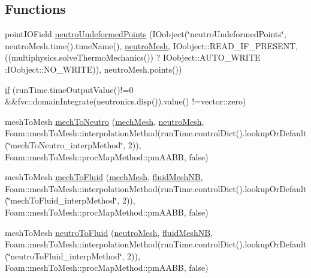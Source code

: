 \subsection*{Functions}
\begin{DoxyCompactItemize}
\item 
point\+I\+O\+Field \hyperlink{createMeshInterpolators_8H_ae1e667a7209da7536e92efe526231ddb}{neutro\+Undeformed\+Points} (I\+Oobject(\char`\"{}neutro\+Undeformed\+Points\char`\"{}, neutro\+Mesh.\+time().time\+Name(), \hyperlink{createNeutroMesh_8H_a5b79902f9ab3ed1763fd3355f92d1cc2}{neutro\+Mesh}, I\+Oobject\+::\+R\+E\+A\+D\+\_\+\+I\+F\+\_\+\+P\+R\+E\+S\+E\+NT,((multiphysics.\+solve\+Thermo\+Mechanics()) ? I\+Oobject\+::\+A\+U\+T\+O\+\_\+\+W\+R\+I\+TE \+:I\+Oobject\+::\+N\+O\+\_\+\+W\+R\+I\+TE)), neutro\+Mesh.\+points())
\item 
\hyperlink{createMeshInterpolators_8H_a3f70f4b99cacc41df7364cd58518429d}{if} (run\+Time.\+time\+Output\+Value()!=0 \&\&fvc\+::domain\+Integrate(neutronics.\+disp()).value() !=vector\+::zero)
\item 
mesh\+To\+Mesh \hyperlink{createMeshInterpolators_8H_a18eefe0dd1b3b5186a867c32aa07dc10}{mech\+To\+Neutro} (\hyperlink{createThermoMechanicalMesh_8H_a56078b48cbec46f3c0f7ef522ad0483a}{mech\+Mesh}, \hyperlink{createNeutroMesh_8H_a5b79902f9ab3ed1763fd3355f92d1cc2}{neutro\+Mesh}, Foam\+::mesh\+To\+Mesh\+::interpolation\+Method(run\+Time.\+control\+Dict().lookup\+Or\+Default(\char`\"{}mech\+To\+Neutro\+\_\+interp\+Method\char`\"{}, 2)), Foam\+::mesh\+To\+Mesh\+::proc\+Map\+Method\+::pm\+A\+A\+BB, false)
\item 
mesh\+To\+Mesh \hyperlink{createMeshInterpolators_8H_afda02081b00dd9bbf0a215328f6833e0}{mech\+To\+Fluid} (\hyperlink{createThermoMechanicalMesh_8H_a56078b48cbec46f3c0f7ef522ad0483a}{mech\+Mesh}, \hyperlink{createFluidMesh_8H_a19096e6b5a147939b336269d09a08e3c}{fluid\+Mesh\+NB}, Foam\+::mesh\+To\+Mesh\+::interpolation\+Method(run\+Time.\+control\+Dict().lookup\+Or\+Default(\char`\"{}mech\+To\+Fluid\+\_\+interp\+Method\char`\"{}, 2)), Foam\+::mesh\+To\+Mesh\+::proc\+Map\+Method\+::pm\+A\+A\+BB, false)
\item 
mesh\+To\+Mesh \hyperlink{createMeshInterpolators_8H_aa7d8334dd5ea1819a83900ea05ace02f}{neutro\+To\+Fluid} (\hyperlink{createNeutroMesh_8H_a5b79902f9ab3ed1763fd3355f92d1cc2}{neutro\+Mesh}, \hyperlink{createFluidMesh_8H_a19096e6b5a147939b336269d09a08e3c}{fluid\+Mesh\+NB}, Foam\+::mesh\+To\+Mesh\+::interpolation\+Method(run\+Time.\+control\+Dict().lookup\+Or\+Default(\char`\"{}neutro\+To\+Fluid\+\_\+interp\+Method\char`\"{}, 2)), Foam\+::mesh\+To\+Mesh\+::proc\+Map\+Method\+::pm\+A\+A\+BB, false)

\end{DoxyCompactItemize}
